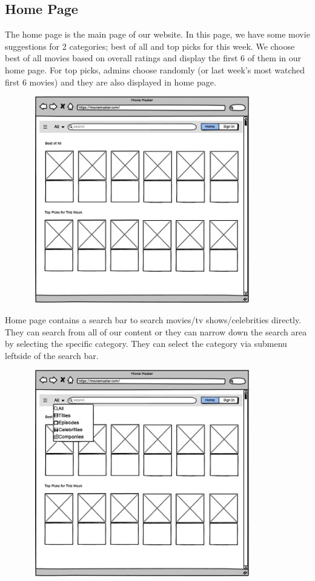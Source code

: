 \subsection{Home Page}

The home page is the main page of our website. In this page, we have some movie suggestions for 2 categories; best of all and top picks for this week. We choose best of all movies based on overall ratings and display the first 6 of them in our home page. For top picks, admins choose randomly (or last week's most watched first 6 movies) and they are also displayed in home page. 

\begin{center}
   \includegraphics[width=12cm, height=9cm]{pictures/Home Page.png}
\end{center}

Home page contains a search bar to search movies/tv shows/celebrities directly. They can search from all of our content or they can narrow down the search area by selecting the specific category. They can select the category via submenu leftside of the search bar. 

\begin{center}
    \includegraphics[width=12cm, height=9cm]{pictures/Search Bar Menu.png}
\end{center}


